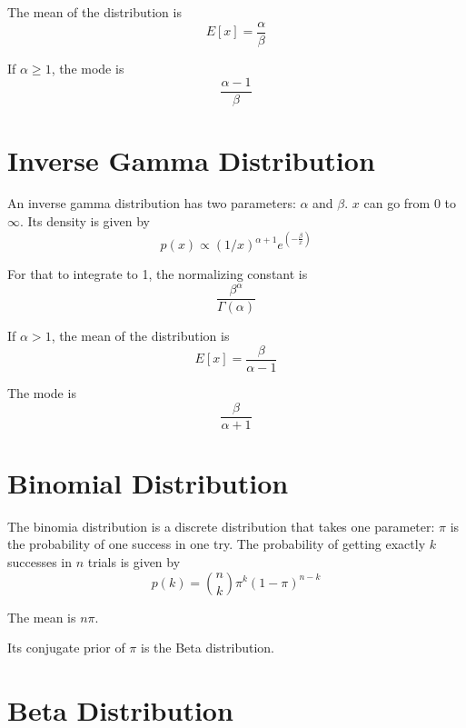 \documentclass[12pt]{article}
\begin{document}
The mean of the distribution is
\begin{equation*}
E[x] = \frac{ \alpha}{\beta}
\end{equation*}

If $\alpha \geq 1$, the mode is 
\begin{equation*}
\frac{ \alpha - 1}{\beta}
\end{equation*}


\section*{Inverse Gamma Distribution}

An inverse gamma distribution has two parameters: $\alpha$ and $\beta$. $x$ can go from $0$ to $\infty$. Its density is given by
\begin{equation*}
p(x) \propto 
(1/x)^{\alpha + 1}e^{\left(-\frac{\beta}{x}\right)}
\end{equation*}

For that to integrate to 1, the normalizing constant is
\begin{equation*}
\frac{\beta^\alpha}{\Gamma(\alpha)}
\end{equation*}

If $\alpha > 1$, the mean of the distribution is
\begin{equation*}
E[x] = \frac{ \beta}{\alpha - 1} 
\end{equation*}

The mode is 
\begin{equation*}
\frac{ \beta}{\alpha + 1}
\end{equation*}

\section*{Binomial Distribution}

The binomia distribution is a discrete distribution that takes one parameter: $\pi$ is the probability of one success in one try. The probability of getting exactly $k$ successes in $n$ trials is given by
\begin{equation*}
p(k) = \binom{n}{k}\pi^k(1-\pi)^{n-k}
\end{equation*}

The mean is $n\pi$.

Its conjugate prior of $\pi$ is the Beta distribution.

\section*{Beta Distribution}
\end{document}
